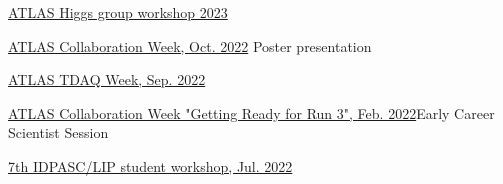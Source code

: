 \begin{cventries}
    {}
    {}
    {\href{https://indico.cern.ch/event/1280531/contributions/5559532/}{ATLAS Higgs group workshop 2023}}{}\vspace*{2mm}

    {}
    {}
    {\href{https://indico.cern.ch/event/1187086/\#37-the-atlas-jet-trigger-in-ru}{ATLAS Collaboration Week, Oct. 2022}}
    {Poster presentation}\vspace*{2mm}

    {}
    {}
    {\href{https://indico.cern.ch/event/1172448/contributions/4924082/}{ATLAS TDAQ Week, Sep. 2022}}
    {}\vspace*{2mm}

    {}
    {}
    {\href{https://indico.cern.ch/event/1108354/\#167-readiness-of-the-jet-trigg}{ATLAS Collaboration Week "Getting Ready for Run 3", Feb. 2022}}{Early Career Scientist Session}



    {\href{https://indico.lip.pt/event/1245/}{7th IDPASC/LIP student workshop, Jul. 2022}}{}
    
    




\end{cventries}